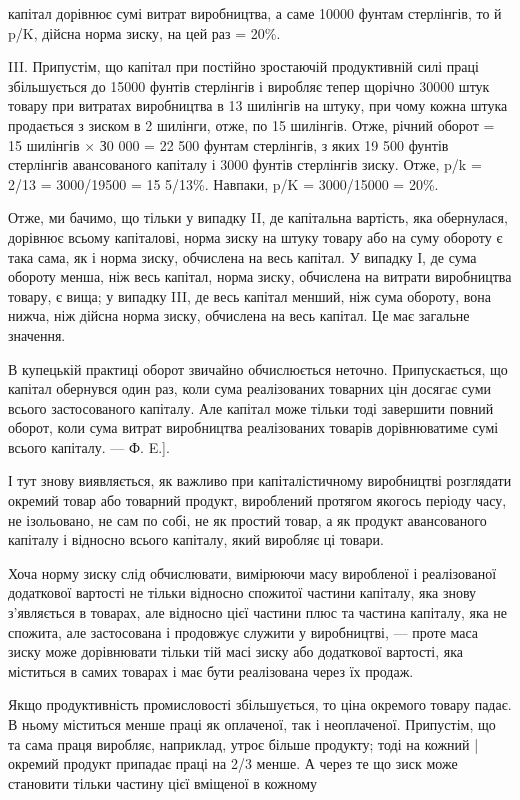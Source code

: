 \parcont{}  %
капітал дорівнює сумі витрат виробництва, а саме 10000 фунтам стерлінгів, то й p/K, дійсна норма
зиску, на цей раз = 20\%.

III. Припустім, що капітал при постійно зростаючій продуктивній силі праці збільшується до 15000
фунтів стерлінгів і виробляє тепер щорічно 30000 штук товару при витратах виробництва в 13 шилінгів
на штуку, при чому кожна штука продається з зиском в 2 шилінги, отже, по 15 шилінгів. Отже, річний
оборот = 15 шилінгів × З0 000 = 22 500 фунтам стерлінгів, з яких 19 500 фунтів стерлінгів
авансованого капіталу і 3000 фунтів стерлінгів зиску. Отже, p/k = 2/13 = 3000/19500 = 15  5/13\%.
Навпаки, p/K = 3000/15000 = 20\%.

Отже, ми бачимо, що тільки у випадку II, де капітальна вартість, яка обернулася, дорівнює всьому
капіталові, норма зиску на штуку товару або на суму обороту є така сама, як і норма зиску, обчислена
на весь капітал. У випадку І, де сума обороту менша, ніж весь капітал, норма зиску, обчислена на
витрати виробництва товару, є вища; у випадку III, де весь капітал менший, ніж сума обороту, вона
нижча, ніж дійсна норма зиску, обчислена на весь капітал. Це має загальне значення.

В купецькій практиці оборот звичайно обчислюється неточно. Припускається, що капітал обернувся один
раз, коли сума реалізованих товарних цін досягає суми всього застосованого капіталу. Але капітал
може тільки тоді завершити повний оборот, коли сума витрат виробництва реалізованих товарів
дорівнюватиме сумі всього капіталу. — Ф. E.].

І тут знову виявляється, як важливо при капіталістичному виробництві розглядати окремий товар або
товарний продукт, вироблений протягом якогось періоду часу, не ізольовано, не сам по собі, не як
простий товар, а як продукт авансованого капіталу і відносно всього капіталу, який виробляє ці
товари.

Хоча норму зиску слід обчислювати, вимірюючи масу виробленої і реалізованої додаткової вартості не
тільки відносно спожитої частини капіталу, яка знову з’являється в товарах, але відносно цієї
частини плюс та частина капіталу, яка не спожита, але застосована і продовжує служити у виробництві,
— проте маса зиску може дорівнювати тільки тій масі зиску або додаткової вартості, яка міститься в
самих товарах і має бути реалізована через їх продаж.

Якщо продуктивність промисловості збільшується, то ціна окремого товару падає. В ньому міститься
менше праці як оплаченої, так і неоплаченої. Припустім, що та сама праця виробляє, наприклад, утроє
більше продукту; тоді на кожний | окремий продукт припадає праці на 2/3 менше. А через те що зиск
може становити тільки частину цієї вміщеної в кожному
\parbreak{}  %
